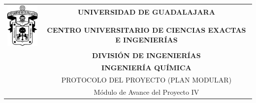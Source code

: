 \begin{center}
  \begin{tabular}{cc}
    \multirow{2}{3.5cm}{\includegraphics[width=2.3cm]{images/udgn.eps}}	& \textbf{UNIVERSIDAD DE GUADALAJARA}\\
      & \textbf{CENTRO UNIVERSITARIO DE CIENCIAS EXACTAS E INGENIERÍAS}\\
      &\textbf{ DIVISIÓN DE INGENIERÍAS}\\
      &\textbf{INGENIERÍA QUÍMICA} \\
      & PROTOCOLO DEL PROYECTO (PLAN MODULAR)\\
      & Módulo de Avance del Proyecto IV\\

  \end{tabular}
\end{center}
